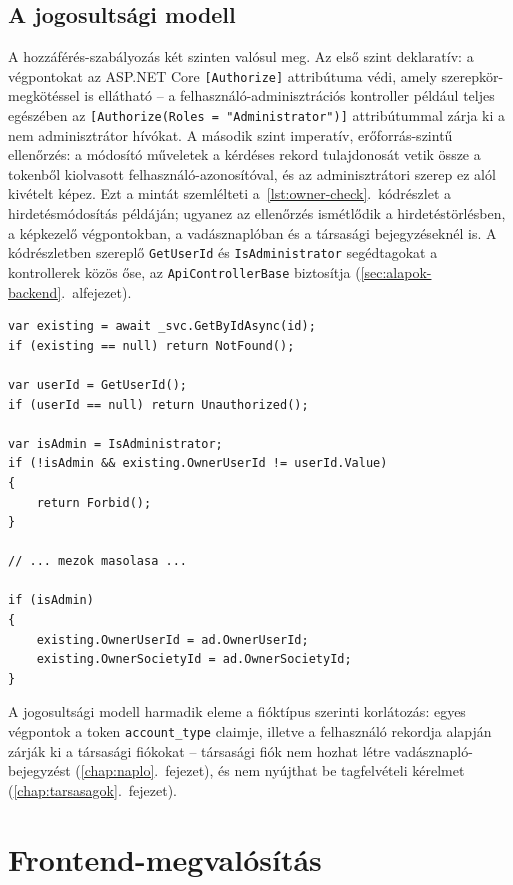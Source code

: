 \subsection{A jogosultsági modell}

A hozzáférés-szabályozás két szinten valósul meg. Az első szint deklaratív: a végpontokat az
ASP.NET Core \texttt{[Authorize]} attribútuma védi, amely szerepkör-megkötéssel is ellátható -- a
felhasználó-adminisztrációs kontroller például teljes egészében az
\texttt{[Authorize(Roles = "Administrator")]} attribútummal zárja ki a nem adminisztrátor
hívókat. A második szint imperatív, erőforrás-szintű ellenőrzés: a módosító műveletek a kérdéses
rekord tulajdonosát vetik össze a tokenből kiolvasott felhasználó-azonosítóval, és az
adminisztrátori szerep ez alól kivételt képez. Ezt a mintát szemlélteti
a~\ref{lst:owner-check}.~kódrészlet a hirdetésmódosítás példáján; ugyanez az ellenőrzés ismétlődik
a hirdetéstörlésben, a képkezelő végpontokban, a vadásznaplóban és a társasági bejegyzéseknél is.
A kódrészletben szereplő \texttt{GetUserId} és \texttt{IsAdministrator} segédtagokat a
kontrollerek közös őse, az \texttt{ApiControllerBase} biztosítja
(\ref{sec:alapok-backend}.~alfejezet).

\begin{lstlisting}[language={[Sharp]C}, caption={Erőforrás-tulajdonos ellenőrzés az \texttt{AdsController.Update} akcióban (kivonat)}, label={lst:owner-check}]
var existing = await _svc.GetByIdAsync(id);
if (existing == null) return NotFound();

var userId = GetUserId();
if (userId == null) return Unauthorized();

var isAdmin = IsAdministrator;
if (!isAdmin && existing.OwnerUserId != userId.Value)
{
    return Forbid();
}

// ... mezok masolasa ...

if (isAdmin)
{
    existing.OwnerUserId = ad.OwnerUserId;
    existing.OwnerSocietyId = ad.OwnerSocietyId;
}
\end{lstlisting}

A jogosultsági modell harmadik eleme a fióktípus szerinti korlátozás: egyes végpontok a token
\texttt{account\_type} claimje, illetve a felhasználó rekordja alapján zárják ki a társasági
fiókokat -- társasági fiók nem hozhat létre vadásznapló-bejegyzést
(\ref{chap:naplo}.~fejezet), és nem nyújthat be tagfelvételi kérelmet
(\ref{chap:tarsasagok}.~fejezet).

\section{Frontend-megvalósítás}
\label{sec:users-frontend}

